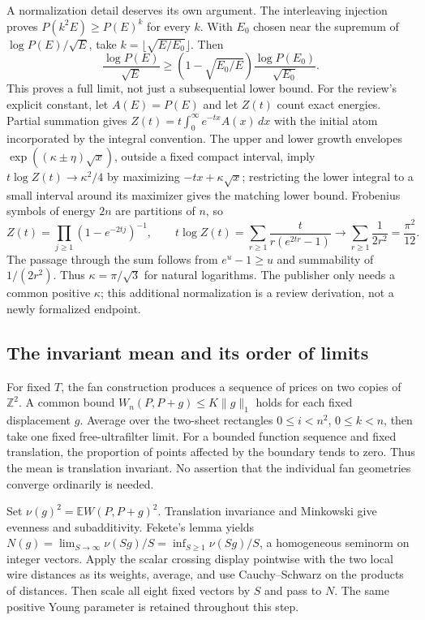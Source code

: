 \documentclass[11pt,letterpaper]{article}
\theoremstyle{definition}\newtheorem{definition}[theorem]{Definition}\newtheorem{example}[theorem]{Example}
\theoremstyle{remark}\newtheorem{remark}[theorem]{Remark}
\begin{document}
A normalization detail deserves its own argument. The interleaving injection proves $P(k^2E)\ge P(E)^k$ for every $k$. With $E_0$ chosen near the supremum of $\log P(E)/\sqrt E$, take $k=\lfloor\sqrt{E/E_0}\rfloor$. Then
\[
 \frac{\log P(E)}{\sqrt E}\ge
 \left(1-\sqrt{E_0/E}\right)\frac{\log P(E_0)}{\sqrt{E_0}}.
\]
This proves a full limit, not just a subsequential lower bound. For the review's explicit constant, let $A(E)=P(E)$ and let $Z(t)$ count exact energies. Partial summation gives $Z(t)=t\int_0^\infty e^{-tx}A(x)\,dx$ with the initial atom incorporated by the integral convention. The upper and lower growth envelopes $\exp((\kappa\pm\eta)\sqrt x)$, outside a fixed compact interval, imply $t\log Z(t)\to\kappa^2/4$ by maximizing $-tx+\kappa\sqrt x$; restricting the lower integral to a small interval around its maximizer gives the matching lower bound. Frobenius symbols of energy $2n$ are partitions of $n$, so
\[
 Z(t)=\prod_{j\ge1}(1-e^{-2tj})^{-1},\qquad
 t\log Z(t)=\sum_{r\ge1}\frac{t}{r(e^{2tr}-1)}\longrightarrow
 \sum_{r\ge1}\frac1{2r^2}=\frac{\pi^2}{12}.
\]
The passage through the sum follows from $e^u-1\ge u$ and summability of $1/(2r^2)$. Thus $\kappa=\pi/\sqrt3$ for natural logarithms. The publisher only needs a common positive $\kappa$; this additional normalization is a review derivation, not a newly formalized endpoint.

\subsection{The invariant mean and its order of limits}
For fixed $T$, the fan construction produces a sequence of prices on two copies of $\mathbb Z^2$. A common bound $W_n(P,P+g)\le K\|g\|_1$ holds for each fixed displacement $g$. Average over the two-sheet rectangles $0\le i<n^2$, $0\le k<n$, then take one fixed free-ultrafilter limit. For a bounded function sequence and fixed translation, the proportion of points affected by the boundary tends to zero. Thus the mean is translation invariant. No assertion that the individual fan geometries converge ordinarily is needed.

Set $\nu(g)^2=\mathbb E W(P,P+g)^2$. Translation invariance and Minkowski give evenness and subadditivity. Fekete's lemma yields $N(g)=\lim_{S\to\infty}\nu(Sg)/S=\inf_{S\ge1}\nu(Sg)/S$, a homogeneous seminorm on integer vectors. Apply the scalar crossing display pointwise with the two local wire distances as its weights, average, and use Cauchy--Schwarz on the products of distances. Then scale all eight fixed vectors by $S$ and pass to $N$. The same positive Young parameter is retained throughout this step.
\end{document}

